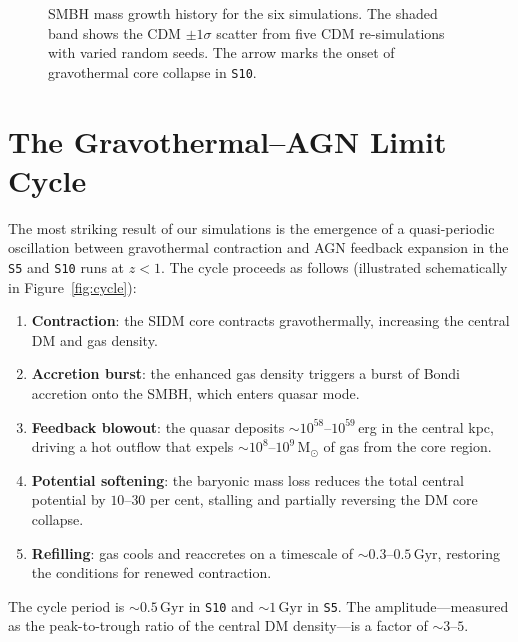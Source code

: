 \documentclass[fleqn,usenatbib]{mnras}
\newcommand{\code}[1]{\texttt{#1}}
\newcommand{\Msun}{\mathrm{M_\odot}}
\newcommand{\Gyr}{\,\mathrm{Gyr}}
\begin{document}
\begin{figure}
  \centering
  \caption{SMBH mass growth history for the six simulations.  The
    shaded band shows the CDM $\pm 1\sigma$ scatter from five CDM
    re-simulations with varied random seeds.  The arrow marks the
    onset of gravothermal core collapse in \code{S10}.}
  \label{fig:mbh}
\end{figure}


\section{The Gravothermal--AGN Limit Cycle}
\label{sec:feedback_loop}

The most striking result of our simulations is the emergence of a
quasi-periodic oscillation between gravothermal contraction and AGN
feedback expansion in the \code{S5} and \code{S10} runs at $z < 1$.
The cycle proceeds as follows (illustrated schematically in
Figure~\ref{fig:cycle}):

\begin{enumerate}
  \item \textbf{Contraction}: the SIDM core contracts gravothermally,
    increasing the central DM and gas density.
  \item \textbf{Accretion burst}: the enhanced gas density triggers a
    burst of Bondi accretion onto the SMBH, which enters quasar mode.
  \item \textbf{Feedback blowout}: the quasar deposits $\sim
    10^{58}$--$10^{59}$\,erg in the central kpc, driving a hot
    outflow that expels $\sim 10^8$--$10^9\,\Msun$ of gas from the
    core region.
  \item \textbf{Potential softening}: the baryonic mass loss reduces
    the total central potential by $10$--$30$ per cent, stalling and
    partially reversing the DM core collapse.
  \item \textbf{Refilling}: gas cools and reaccretes on a timescale of
    $\sim 0.3$--$0.5\Gyr$, restoring the conditions for renewed
    contraction.
\end{enumerate}

The cycle period is $\sim 0.5\Gyr$ in \code{S10} and $\sim 1\Gyr$ in
\code{S5}.  The amplitude---measured as the peak-to-trough ratio of
the central DM density---is a factor of $\sim 3$--$5$.
\end{document}
